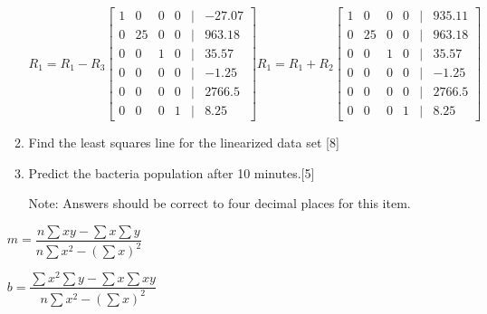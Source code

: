 \documentclass[11pt]{article}
\begin{document}
\begin{enumerate}
\begin{enumerate}
\[
    R_1 = R_1 - R_3
    \begin{bmatrix}
        1 & 0 & 0 & 0 &|& -27.07 \\
        0 & 25 & 0 & 0 &|& 963.18 \\
        0 & 0 & 1 & 0 &|& 35.57 \\
        0 & 0 & 0 & 0 &|& -1.25 \\
        0 & 0 & 0 & 0 &|& 2766.5 \\
        0 & 0 & 0 & 1 &|& 8.25
    \end{bmatrix}
    R_1 = R_1 + R_2
    \begin{bmatrix}
        1 & 0 & 0 & 0 &|& 935.11 \\
        0 & 25 & 0 & 0 &|& 963.18 \\
        0 & 0 & 1 & 0 &|& 35.57 \\
        0 & 0 & 0 & 0 &|& -1.25 \\
        0 & 0 & 0 & 0 &|& 2766.5 \\
        0 & 0 & 0 & 1 &|& 8.25
    \end{bmatrix}
\]



\item Find the least squares line for the linearized data set \hfill[8]

\item Predict the bacteria population after 10 minutes.\hfill[5]


Note: Answers should be correct to four decimal places for this item.

\end{enumerate}

\begin{center}
$m=\dfrac{n\sum xy -\sum x\sum y}{n\sum x^2 -(\sum x)^2}$

$b=\dfrac{\sum x^2\sum y - \sum x\sum xy}{n\sum x^2 -(\sum x)^2}$

\end{center}







\end{enumerate}
\vspace{0.5cm} %
\end{document}
